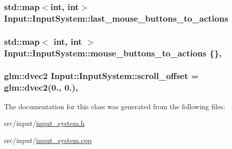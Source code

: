 \subsubsection[{last\+\_\+mouse\+\_\+buttons\+\_\+to\+\_\+actions}]{\setlength{\rightskip}{0pt plus 5cm}std\+::map$<$int, int$>$ Input\+::\+Input\+System\+::last\+\_\+mouse\+\_\+buttons\+\_\+to\+\_\+actions\hspace{0.3cm}{\ttfamily [private]}}\label{class_input_1_1_input_system_a114e8f05ef3fa1dfb9bc7846110a17df}
\hypertarget{class_input_1_1_input_system_aef7be617b0a51e5fbd854100212438c8}{}
\subsubsection[{mouse\+\_\+buttons\+\_\+to\+\_\+actions}]{\setlength{\rightskip}{0pt plus 5cm}std\+::map$<$ int, int $>$ Input\+::\+Input\+System\+::mouse\+\_\+buttons\+\_\+to\+\_\+actions \{\}\hspace{0.3cm}{\ttfamily [static]}, {\ttfamily [private]}}\label{class_input_1_1_input_system_aef7be617b0a51e5fbd854100212438c8}
\hypertarget{class_input_1_1_input_system_a7d9b7ce763b48a16d3feff0c93a14428}{}
\subsubsection[{scroll\+\_\+offset}]{\setlength{\rightskip}{0pt plus 5cm}glm\+::dvec2 Input\+::\+Input\+System\+::scroll\+\_\+offset = glm\+::dvec2(0., 0.)\hspace{0.3cm}{\ttfamily [static]}, {\ttfamily [private]}}\label{class_input_1_1_input_system_a7d9b7ce763b48a16d3feff0c93a14428}


The documentation for this class was generated from the following files\+:\begin{DoxyCompactItemize}
\item 
src/input/\hyperlink{input__system_8h}{input\+\_\+system.\+h}\item 
src/input/\hyperlink{input__system_8cpp}{input\+\_\+system.\+cpp}\end{DoxyCompactItemize}
